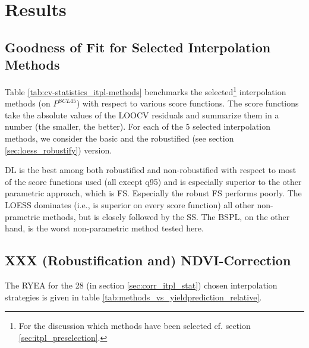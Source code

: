 \chapter{Results}\label{sec:results}

\section{Goodness of Fit for Selected Interpolation Methods}{
	\label{sec:results_itpl}
	Table \ref{tab:cv-statistics_itpl-methods} benchmarks the selected\footnote{\label{note:selected-IM} For the discussion which methods have been selected cf. section \ref{sec:itpl_preselection}.} interpolation methods (on $P^{SCL45}$) with respect to various score functions. The score functions take the absolute values of the LOOCV residuals and summarize them in a number (the smaller, the better). For each of the 5 selected interpolation methods, we consider the basic and the robustified (see section \ref{sec:loess_robustify}) version.

	\begin{table}[h]
		\begin{center}
			\caption{Comparing the goodness of fit for selected%
			interpolation methods (on $P^{SCL45}$) measured with the score functions (that take the LOOCV residuals as input) listed in the left column. $q_X$ denotes here the $X\%$ quantile.}
			\scriptsize
			
			\normalsize
			\label{tab:cv-statistics_itpl-methods}
		\end{center}
	\end{table}
	
	DL is the best among both robustified and non-robustified with respect to most of the score functions used (all except q95) and is especially superior to the other parametric approach, which is FS. Especially the robust FS performs poorly. The LOESS dominates (i.e., is superior on every score function) all other non-prametric methods, but is closely followed by the SS. The BSPL, on the other hand, is the worst non-parametric method tested here. 
}


\section{XXX (Robustification and) NDVI-Correction} \label{sec:results_ndvi_corr}
	The RYEA for the 28 (in section \ref{sec:corr_itpl_stat}) chosen interpolation strategies is given in table \ref{tab:methods_vs_yieldprediction_relative}. 

